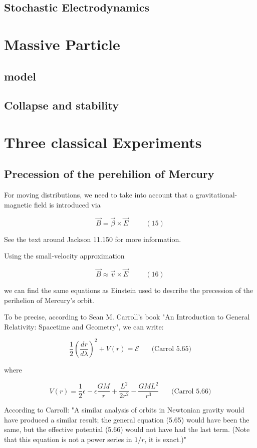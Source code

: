 \documentclass {article}
\begin{document}
\subsection{Stochastic Electrodynamics}
\newpage

\section{Massive Particle}
\subsection{model}
\newpage
\subsection{Collapse and stability}
\newpage


\section{Three classical Experiments}
\subsection{Precession of the perehilion of Mercury}
For moving distributions, we need to take into account that a gravitational-magnetic field is introduced via

$$\vec B = \vec \beta \times \vec E ~~~~~~~~~~~ (15)$$

See the text around Jackson 11.150 for more information. 

Using the small-velocity approximation 

$$\vec B \approx \vec v \times \vec E ~~~~~~~~~~~ (16)$$

we can find the same equations as Einstein used to describe the precession of the perihelion of Mercury's orbit. 

To be precise, according to Sean M. Carroll's book "An Introduction to General Relativity: Spacetime and Geometry", we can write:

$$\frac 1 2 \left( \frac {dr}{d\lambda} \right)^2 + V(r) = \mathcal{E} ~~~~~~~~ \textrm{(Carrol 5.65)} $$

where

$$V(r) = \frac 1 2 \epsilon - \epsilon \frac {GM} r + \frac {L^2}{2r^2} - \frac {GML^2}{r^3} ~~~~~~~~ \textrm{(Carrol 5.66)} $$

According to Carroll: "A similar analysis of orbits in Newtonian gravity would have produced a similar result; the general equation (5.65) would have been the same, but the effective potential (5.66) would not have had the last term. (Note that this equation is not a power series in $1/r$, it is exact.)"
\end{document}
